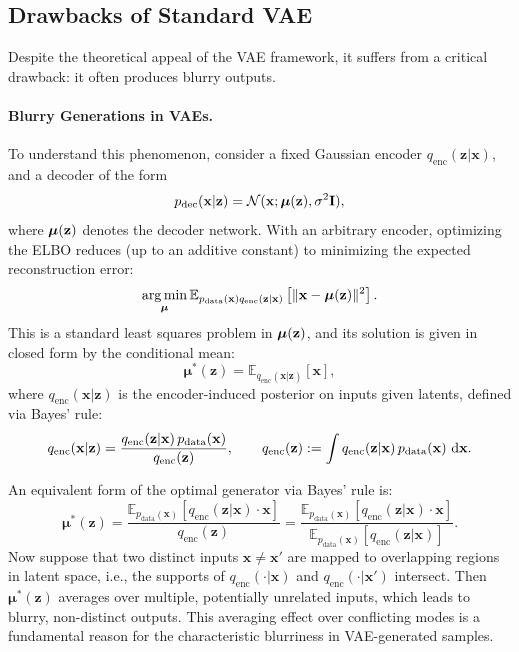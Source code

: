 \subsection{Drawbacks of Standard VAE}\label{sec:drawback_standard_VAE}
Despite the theoretical appeal of the VAE framework, it suffers from a critical drawback: it often produces blurry outputs.

\paragraph{Blurry Generations in VAEs.}
To understand this phenomenon, consider a fixed Gaussian encoder $ q_{\text{enc}}(\mathbf{z}|\mathbf{x}) $, and a decoder of the form
\[
p_{\text{dec}}(\mathbf{x}|\mathbf{z}) = \mathcal{N}(\mathbf{x}; \bm{\mu}({\mathbf{z}}), \sigma^2 {\mathbf{I}}),
\]
where $ \bm{\mu}({\mathbf{z}}) $ denotes the decoder network. With an arbitrary encoder, optimizing the ELBO reduces (up to an additive constant) to minimizing the expected reconstruction error:
\[
\operatorname*{arg\,min}_{\bm{\mu}} \mathbb{E}_{p_{\text{data}}(\mathbf{x})q_{\text{enc}}(\mathbf{z}|\mathbf{x})} \left[ \| \mathbf{x} - \bm{\mu}({\mathbf{z}}) \|^2 \right].
\]
This is a standard least squares problem in $ \bm{\mu}({\mathbf{z}}) $, and its solution is given in closed form by the conditional mean:
\[
\bm{\mu}^*(\mathbf{z}) = \mathbb{E}_{q_{\text{enc}}(\mathbf{x}|\mathbf{z})}[\mathbf{x}],
\]
where $ q_{\text{enc}}(\mathbf{x}|\mathbf{z}) $ is the encoder-induced posterior on inputs given latents, defined via Bayes’ rule:
\[
q_{\text{enc}}(\mathbf{x}|\mathbf{z})
=
\frac{q_{\text{enc}}(\mathbf{z}|\mathbf{x})\, p_{\text{data}}(\mathbf{x})}{q_{\text{enc}}(\mathbf{z})},
\qquad
q_{\text{enc}}(\mathbf{z})
:=
\int q_{\text{enc}}(\mathbf{z}|\mathbf{x})\, p_{\text{data}}(\mathbf{x})\, \mathop{}\!\mathrm{d} \mathbf{x}.
\]

An equivalent form of the optimal generator via Bayes' rule is:
\[
\bm{\mu}^*(\mathbf{z})
=
\frac{\mathbb{E}_{p_{\text{data}}(\mathbf{x})}\!\left[q_{\text{enc}}(\mathbf{z}|\mathbf{x}) \cdot \mathbf{x}\right]}
{q_{\text{enc}}(\mathbf{z})}
=
\frac{\mathbb{E}_{p_{\text{data}}(\mathbf{x})}\!\left[q_{\text{enc}}(\mathbf{z}|\mathbf{x}) \cdot \mathbf{x}\right]}
{\mathbb{E}_{p_{\text{data}}(\mathbf{x})}\!\left[q_{\text{enc}}(\mathbf{z}|\mathbf{x})\right]}.
\]
Now suppose that two distinct inputs $ \mathbf{x} \neq \mathbf{x}' $ are mapped to overlapping regions in latent space, i.e., the supports of $ q_{\text{enc}}(\cdot|\mathbf{x}) $ and $ q_{\text{enc}}(\cdot|\mathbf{x}') $ intersect. Then $\bm{\mu}^*(\mathbf{z})$ averages over multiple, potentially unrelated inputs, which leads to blurry, non-distinct outputs. This averaging effect over conflicting modes is a fundamental reason for the characteristic blurriness in VAE-generated samples.




